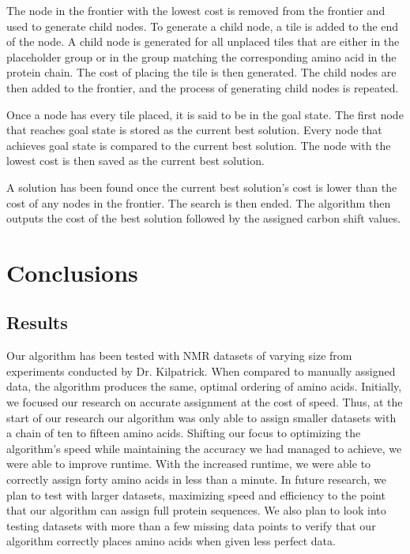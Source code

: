 \documentclass[12pt]{article}
\begin{document}
The node in the frontier with the lowest cost is removed from the frontier and used to generate child nodes. To generate a child node, a tile is added to the end of the node. A child node is generated for all unplaced tiles that are either in the placeholder group or in the group matching the corresponding amino acid in the protein chain. The cost of placing the tile is then generated.  The child nodes are then added to the frontier, and the process of generating child nodes is repeated. 

Once a node has every tile placed, it is said to be in the goal state. The first node that reaches goal state is stored as the current best solution. Every node that achieves goal state is compared to the current best solution. The node with the lowest cost is then saved as the current best solution. 

A solution has been found once the current best solution's cost is lower than the cost of any nodes in the frontier. The search is then ended. The algorithm then outputs the cost of the best solution followed by the assigned carbon shift values. 

\section{Conclusions}
\label{sec:conclusions}

\subsection{Results}
\label{sub:results}
Our algorithm has been tested with NMR datasets of varying size from experiments conducted by Dr. Kilpatrick.  When compared to manually assigned data, the algorithm produces the same, optimal ordering of amino acids. Initially, we focused our research on accurate assignment at the cost of speed. Thus, at the start of our research our algorithm was only able to assign smaller datasets with a chain of ten to fifteen amino acids. Shifting our focus to optimizing the algorithm's speed while maintaining the accuracy we had managed to achieve, we were able to improve runtime. With the increased runtime, we were able to correctly assign forty amino acids in less than a minute. In future research, we plan to test with larger datasets, maximizing speed and efficiency to the point that our algorithm can assign full protein sequences. We also plan to look into testing datasets with more than a few missing data points to verify that our algorithm correctly places amino acids when given less perfect data.  
\end{document}
